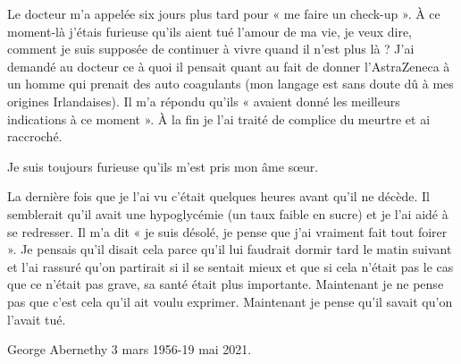 {Le docteur m’a appelée six jours plus tard pour « me faire un check-up ». À ce moment-là j’étais furieuse qu’ils aient tué l’amour de ma vie, je veux dire, comment je suis supposée de continuer à vivre quand il n’est plus là ? J’ai demandé au docteur ce à quoi il pensait quant au fait de donner l’AstraZeneca à un homme qui prenait des auto coagulants (mon langage est sans doute dû à mes origines Irlandaises). Il m’a répondu qu’ils « avaient donné les meilleurs indications à ce moment ». À la fin je l’ai traité de complice du meurtre et ai raccroché.

Je suis toujours furieuse qu’ils m’est pris mon âme sœur.

La dernière fois que je l’ai vu c’était quelques heures avant qu’il ne décède. Il semblerait qu’il avait une hypoglycémie (un taux faible en sucre) et je l’ai aidé à se redresser. Il m’a dit « je suis désolé, je pense que j’ai vraiment fait tout foirer ». Je pensais qu’il disait cela parce qu’il lui faudrait dormir tard le matin suivant et l’ai rassuré qu’on partirait si il se sentait mieux et que si cela n’était pas le cas que ce n’était pas grave, sa santé était plus importante. Maintenant je ne pense pas que c’est cela qu’il ait voulu exprimer. Maintenant je pense qu’il savait qu’on l’avait tué.

George Abernethy 3 mars 1956-19 mai 2021.

}
